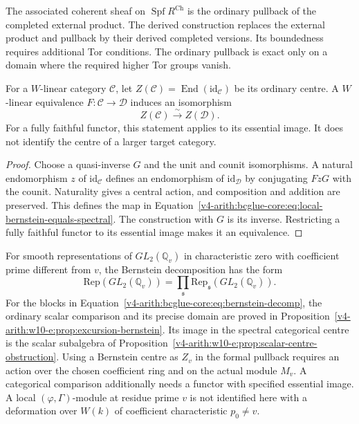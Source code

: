 The associated coherent sheaf on $\operatorname{Spf}R^{\mathrm{Ch}}$
is the ordinary pullback of the completed external product.
The derived construction replaces the external product and pullback
by their derived completed versions. Its boundedness requires
additional Tor conditions. The ordinary pullback is exact only on
a domain where the required higher Tor groups vanish.

\begin{proposition}
\label{v4-arith:bcglue-core:thm:local-bernstein}
For a $W$-linear category $\mathcal C$, let
$Z(\mathcal C)=\operatorname{End}(\mathrm{id}_{\mathcal C})$
be its ordinary centre. A $W$-linear equivalence
$F:\mathcal C\to\mathcal D$ induces an isomorphism
\begin{equation}
\label{v4-arith:bcglue-core:eq:local-bernstein-equals-spectral}
 Z(\mathcal C)\xrightarrow{\sim}Z(\mathcal D).
\end{equation}
For a fully faithful functor, this statement applies to its essential
image. It does not identify the centre of a larger target category.
\end{proposition}

\begin{proof}
Choose a quasi-inverse $G$ and the unit and counit isomorphisms.
A natural endomorphism $z$ of $\mathrm{id}_{\mathcal C}$ defines
an endomorphism of $\mathrm{id}_{\mathcal D}$ by conjugating
$FzG$ with the counit. Naturality gives a central action, and
composition and addition are preserved. This defines the map in
Equation~\eqref{v4-arith:bcglue-core:eq:local-bernstein-equals-spectral}.
The construction with $G$
is its inverse. Restricting a fully faithful functor to its essential
image makes it an equivalence.
\end{proof}

\begin{remark}
\label{v4-arith:bcglue-core:rem:local-domain}
For smooth representations of $GL_2(\mathbb Q_v)$ in
characteristic zero with coefficient prime different from $v$,
the Bernstein decomposition has the form
\begin{equation}
\label{v4-arith:bcglue-core:eq:bernstein-decomp}
 \mathrm{Rep}(GL_2(\mathbb Q_v))
   =\prod_{\mathfrak s}\mathrm{Rep}_{\mathfrak s}(GL_2(\mathbb Q_v)).
\end{equation}
For the blocks in Equation~\eqref{v4-arith:bcglue-core:eq:bernstein-decomp},
the ordinary scalar comparison and its precise domain are proved in
Proposition~\ref{v4-arith:w10-e:prop:excursion-bernstein}.
Its image in the spectral categorical centre is the scalar subalgebra
of Proposition~\ref{v4-arith:w10-e:prop:scalar-centre-obstruction}.
Using a Bernstein centre as $Z_v$ in the formal pullback requires
an action over the chosen coefficient ring and on the actual module
$M_v$. A categorical comparison additionally needs a functor with
specified essential image. A local $(\varphi,\Gamma)$-module at
residue prime $v$ is not identified here with a deformation over
$W(k)$ of coefficient characteristic $p_0\ne v$.
\end{remark}

